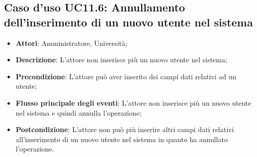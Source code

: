 \subsection{Caso d'uso \texorpdfstring{UC11.6}{UC11.6}: Annullamento dell'inserimento di un nuovo utente nel sistema}
\begin{itemize}
\item \textbf{Attori}: Amministratore, Università;
\item \textbf{Descrizione}: L'attore non inserisce più un nuovo utente nel sistema;
\item \textbf{Precondizione}: L'attore può aver inserito dei campi dati relativi ad un utente;
\item \textbf{Flusso principale degli eventi}: L'attore non inserisce più un nuovo utente nel sistema e quindi annulla l'operazione;
\item \textbf{Postcondizione}: L'attore non può più inserire altri campi dati relativi all'inserimento di un nuovo utente nel sistema in quanto ha annullato l'operazione.
\end{itemize}
